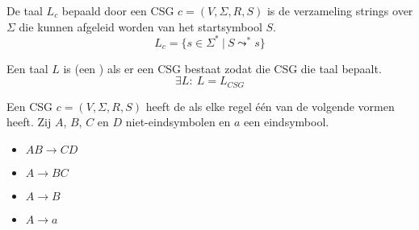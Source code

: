 \documentclass[main.tex]{subfiles}
\begin{document}
\begin{de}
  De taal $L_{c}$ bepaald door een CSG $c = (V,\Sigma,R,S)$ is de verzameling strings over $\Sigma$ die kunnen afgeleid worden van het startsymbool $S$.
  \[ L_{c} = \{ s \in \Sigma^{*}\ |\ S \leadsto^{*} s \}
\]
\end{de}

\begin{de}
  Een taal $L$ is  (een ) als er een CSG bestaat zodat die CSG die taal bepaalt.
  \[ \exists L:\ L = L_{CSG} \]
\end{de}

\begin{de}
  Een CSG $c = (V,\Sigma,R,S)$ heeft de  als elke regel \'e\'en van de volgende vormen heeft.
  Zij $A$, $B$, $C$ en $D$ niet-eindsymbolen en $a$ een eindsymbool.
  \begin{itemize}
  \item $AB \rightarrow CD$
  \item $A \rightarrow BC$
  \item $A \rightarrow B$
  \item $A \rightarrow a$
  \end{itemize}
\end{de}

\end{document}
